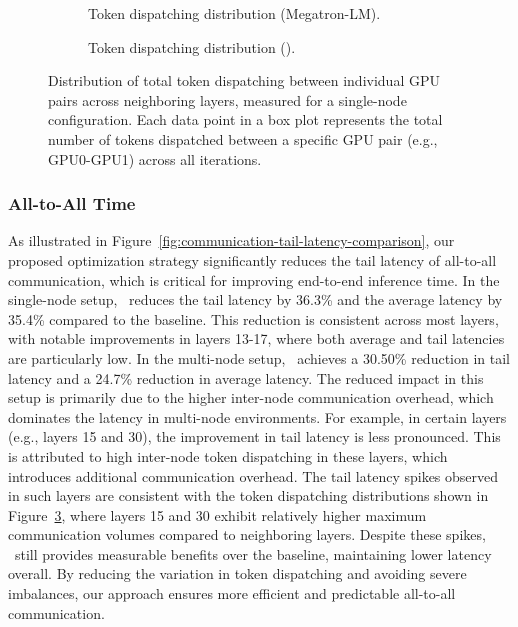\begin{figure}
    \centering
    \begin{subfigure}[b]{0.485\linewidth}
        \centering
        
        \caption{Token dispatching distribution (Megatron-LM).}
        \label{fig:comm-vanilla}
    \end{subfigure}
    \begin{subfigure}[b]{0.485\linewidth}
        \centering
        
        \caption{Token dispatching distribution (\expertune).}
        \label{fig:comm-custom}
    \end{subfigure}
    \caption{Distribution of total token dispatching between individual GPU pairs across neighboring layers, measured for a single-node configuration. Each data point in a box plot represents the total number of tokens dispatched between a specific GPU pair (e.g., GPU0-GPU1) across all iterations.
    }
    \vspace{-1em}
    \label{fig:comm-volume}
\end{figure}



\subsubsection{All-to-All Time}
%
As illustrated in Figure~\ref{fig:communication-tail-latency-comparison}, our proposed optimization strategy significantly reduces the tail latency of all-to-all communication, which is critical for improving end-to-end inference time.
%
In the single-node setup, \expertune~reduces the tail latency by 36.3\% and the average latency by 35.4\% compared to the baseline.
%
This reduction is consistent across most layers, with notable improvements in layers 13-17, where both average and tail latencies are particularly low.
%
In the multi-node setup, \expertune~achieves a 30.50\% reduction in tail latency and a 24.7\% reduction in average latency.
%
The reduced impact in this setup is primarily due to the higher inter-node communication overhead, which dominates the latency in multi-node environments.
%
For example, in certain layers (e.g., layers 15 and 30), the improvement in tail latency is less pronounced.
%
This is attributed to high inter-node token dispatching in these layers, which introduces additional communication overhead.
%
The tail latency spikes observed in such layers are consistent with the token dispatching distributions shown in Figure~\ref{fig:comm-volume}, where layers 15 and 30 exhibit relatively higher maximum communication volumes compared to neighboring layers.
%
Despite these spikes, \expertune~still provides measurable benefits over the baseline, maintaining lower latency overall.
%
By reducing the variation in token dispatching and avoiding severe imbalances, our approach ensures more efficient and predictable all-to-all communication.

